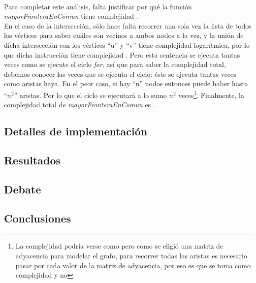 \paragraph{}
Para completar este análisis, falta justificar por qué la función \textit{mayorFronteraEnComun} tiene complejidad .\\
En el caso de la intersección, sólo hace falta recorrer una sola vez la lista de todos los vértices para saber cuáles son vecinos a ambos nodos a la vez, y la unión de dicha intersección con los vértices ``u'' y ``v'' tiene complejidad logarítmica, por lo que dicha instrucción tiene complejidad . Pero esta sentencia se ejecuta tantas veces como se ejecute el ciclo \textit{for}, así que para saber la complejidad total, debemos conocer las veces que se ejecuta el ciclo: éste se ejecuta tantas veces como aristas haya. En el peor caso, si hay ``n'' nodos entonces puede haber hasta ``$n^2$'' aristas. Por lo que el ciclo se ejecutará a lo sumo $n^2$ veces\footnote{La complejidad podría verse como  pero como se eligió una matriz de adyacencia para modelar el grafo, para recorrer todas las aristas es necesario pasar por cada valor de la matriz de adyacencia, por eso es que se toma como complejidad  y no }. Finalmente, la complejidad total de \textit{mayorFronteraEnComun} es . 


\subsection{Detalles de implementación}
\subsection{Resultados}
\subsection{Debate}
\subsection{Conclusiones}
